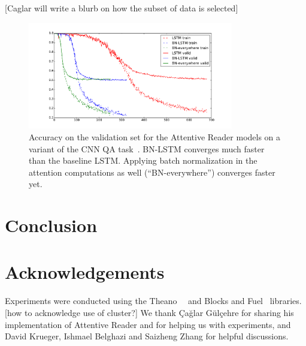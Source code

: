 \documentclass{article} %
\begin{document}
[Caglar will write a blurb on how the subset of data is selected]

\begin{figure}
\center
\includegraphics[width=0.8\textwidth]{figures/attr_valid.pdf}
\caption{
Accuracy on the validation set for the Attentive Reader models on a variant of the CNN QA task~\cite{attentivereader}.
BN-LSTM converges much faster than the baseline LSTM.
Applying batch normalization in the attention computations as well (``BN-everywhere'') converges faster yet.
}
\label{fig:attr_valid}
\end{figure}

\section{Conclusion}

\section*{Acknowledgements}

Experiments were conducted using the Theano~\cite{theano1}~\cite{theano2} and Blocks and Fuel~\cite{blocks} libraries.
[how to acknowledge use of cluster?]
We thank Çağlar Gülçehre for sharing his implementation of Attentive Reader and for helping us with experiments,
and David Krueger, Ishmael Belghazi and Saizheng Zhang for helpful discussions.



\end{document}
